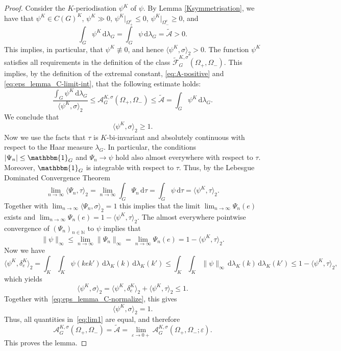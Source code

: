 \documentclass[[a4paper,english,12pt]{amsart}
\theoremstyle{plain}
\theoremstyle{remark}
\newcommand{\NN}{\mathbb N}
\begin{document}
\begin{proof}
Consider the $K$-periodisation $\psi^K$ of $\psi$. By Lemma \ref{Ksymmetrisation}, we have that $\psi^K \in C(G)^K$, $\psi^K \gg 0$, $\psi^{K}|_{\Omega_+^c} \le 0$, $\psi^{K}|_{\Omega_-^c} \ge 0$, and 
\begin{equation} \label{eq:eps_lemma_C-limit-int}
\int_{G}\psi^{K} \,\mbox{d}\lambda_G = \int_{G}\psi \,\mbox{d}\lambda_{G} = \widetilde{\mathcal{A}} > 0.
\end{equation}
This implies, in particular, that $\psi^K \not\equiv 0$, and hence $\langle \psi^K,\sigma \rangle_2 > 0$. The function $\psi^K$ satisfies all requirements in the definition of the class $\widetilde{\mathcal{F}}^{K,\sigma}_G(\Omega_+, \Omega_-)$. This implies, by the definition of the extremal constant, \eqref{eq:A-positive} and \eqref{eq:eps_lemma_C-limit-int}, that the following estimate holds:
\begin{equation}\label{eq:lim1}
\frac{\int_G \psi^K \,\mbox{d}\lambda_G}{\langle \psi^K, \sigma \rangle_2} 
\le \mathcal{A}^{K,\sigma}_G(\Omega_+, \Omega_{-})
\le \widetilde{\mathcal{A}} 
= \int_{G}\psi^{K} \,\mbox{d}\lambda_G.
\end{equation}
We conclude that
\begin{equation} \label{eq:eps_lemma_C-normalize}
\langle \psi^K, \sigma \rangle_2 \ge 1.
\end{equation}
Now we use the facts that $\tau$ is $K$-bi-invariant and absolutely continuous with respect to the Haar measure $\lambda_G$.  In particular, the conditions $|\Psi_n| \le \mathbbm{1}_G$ and $\Psi_n \to \psi$ hold also almost everywhere with respect to \(\tau\). Moreover, $\mathbbm{1}_G$ is integrable with respect to $\tau$. Thus, by the Lebesgue Dominated Convergence Theorem
$$
\lim_{n \to \infty} \langle \Psi_n, \tau \rangle_2 = \lim_{n \to \infty} \int_G \Psi_n \,\mbox{d}\tau 
= \int_G \psi \, \mbox{d}\tau = \langle \psi^K, \tau \rangle_2.
$$
Together with $\lim_{n \to \infty} \langle \Psi_n, \sigma \rangle_2 = 1$ this implies that the limit $\lim_{n \to \infty} \Psi_n(e)$ exists and 
$\lim_{n \to \infty} \Psi_n(e) = 1 - \langle \psi^K, \tau \rangle_2$.
The almost everywhere pointwise convergence of $(\Psi_n)_{n \in \NN}$ to $\psi$ implies that 
$$
\|\psi\|_\infty \le \lim_{n \to \infty} \| \Psi_n \|_\infty = \lim_{n \to \infty} \Psi_n(e) = 1 - \langle \psi^K, \tau \rangle_2.
$$
Now we have
$$
\langle \psi^K, \delta_e^K \rangle_2 = \int_{K}\int_{K}\psi(kek') \,\mbox{d}\lambda_K(k) \,\mbox{d}\lambda_{K}(k') 
\le \int_{K}\int_{K} \| \psi\|_\infty \,\mbox{d}\lambda_{K}(k) \,\mbox{d}\lambda_{K}(k') \le 1 - \langle \psi^K, \tau \rangle_2,
$$
which yields
$$
\langle \psi^K, \sigma \rangle_2 = \langle \psi^K, \delta_e^K \rangle_2 + \langle \psi^K, \tau \rangle_2 \le 1.
$$
Together with~\eqref{eq:eps_lemma_C-normalize}, this gives
$$
\langle \psi^K, \sigma \rangle_2 = 1.
$$
Thus, all quantities in~\eqref{eq:lim1} are equal, and therefore
$$
\mathcal{A}^{K,\sigma}_G(\Omega_+, \Omega_{-}) = \widetilde{\mathcal{A}} =  \lim_{\varepsilon \to 0+} \mathcal{A}^{K,\sigma}_G(\Omega_+, \Omega_-;\varepsilon). 
$$
This proves the lemma. 
\end{proof}
\end{document}
